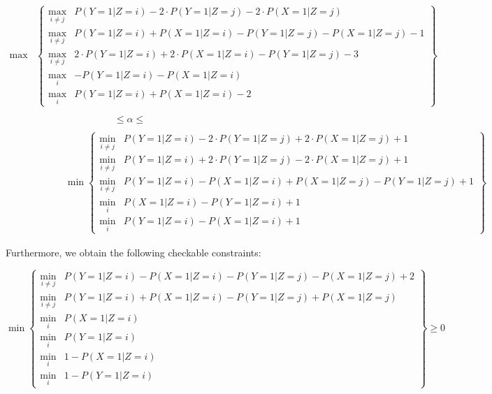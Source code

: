 \documentclass[
]{article}
\theoremstyle{plain}
\begin{document}
\[
\begin{aligned}
\max &\left \{
\begin{array}{ll}
  \max_{i\neq j} & P(Y = 1 | Z = i) - 2\cdot P(Y = 1 | Z = j) - 2\cdot P(X = 1 | Z = j) \\
  \max_{i\neq j} & P(Y = 1 | Z = i) + P(X = 1 | Z = i) - P(Y = 1 | Z = j) - P(X = 1 | Z = j) - 1 \\
  \max_{i\neq j} & 2\cdot P(Y = 1 | Z = i) + 2\cdot P(X = 1 | Z = i) - P(Y = 1 | Z = j) - 3 \\
  \max_i & -P(Y = 1 | Z = i) - P(X = 1 | Z = i) \\
  \max_i & P(Y = 1 | Z = i) +  P(X = 1 | Z = i) - 2
\end{array}
\right \} \\ \\
& \qquad \qquad \qquad \qquad \le \alpha \le \\ \\
& \qquad \quad \min \left \{
\begin{array}{ll}
  \min_{i \neq j} & P(Y = 1 | Z = i) - 2\cdot P(Y = 1 | Z = j) +  2\cdot P(X = 1 | Z = j) + 1 \\
  \min_{i \neq j} & P(Y = 1 | Z = i) + 2\cdot P(Y = 1 | Z = j) -  2\cdot P(X = 1 | Z = j) + 1 \\
  \min_{i \neq j} & P(Y = 1 | Z = i) - P(X = 1 | Z = i) + P(X = 1 | Z = j) - P(Y = 1 | Z = j) + 1 \\
  \min_i & P(X = 1 | Z = i) - P(Y = 1 | Z = i) + 1 \\
  \min_i & P(Y = 1 | Z = i) - P(X = 1 | Z = i) + 1 
\end{array} 
\right \}
\end{aligned}
\]

Furthermore, we obtain the following checkable constraints:

\begin{equation}
\min \left\{
  \begin{array}{ll}
    \min_{i\neq j} & P(Y = 1 | Z = i) - P(X = 1 | Z = i) - P(Y = 1 | Z = j) - P(X = 1 | Z = j) + 2 \\
    \min_{i\neq j} & P(Y = 1 | Z = i) + P(X = 1 | Z = i) - P(Y = 1 | Z = j) + P(X = 1 | Z = j) \\
    \min_{i} & P(X = 1 | Z = i) \\
    \min_{i} & P(Y = 1 | Z = i) \\
    \min_{i} & 1 - P(X = 1 | Z = i) \\
    \min_{i} & 1 - P(Y = 1 | Z = i) 
  \end{array} 
\right \} \ge 0 \label{eq:constraints}
\end{equation}
\end{document}
